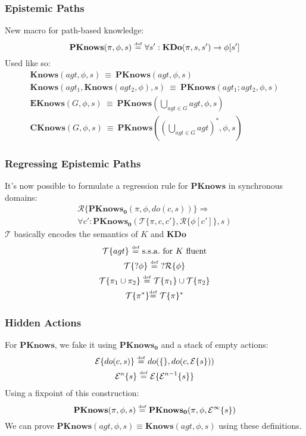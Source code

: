 \documentclass{beamer}
\newcommand{\isdef}{\hbox{$\stackrel{\mbox{\tiny def}}{=}$}}
\begin{document}
\begin{frame}
\frametitle{Epistemic Paths}
New macro for path-based knowledge:
\begin{equation*}
\mathbf{PKnows}(\pi,\phi,s)\ \isdef\ \forall s': \mathbf{KDo}(\pi,s,s') \rightarrow \phi[s']
\end{equation*}
Used like so:
\begin{gather*}
\mathbf{Knows}(agt,\phi,s)\ \equiv\ \mathbf{PKnows}(agt,\phi,s)\\
\mathbf{Knows}(agt_1,\mathbf{Knows}(agt_2,\phi),s)\ \equiv\ \mathbf{PKnows}(agt_1 ; agt_2,\phi,s)\\
\mathbf{EKnows}(G,\phi,s)\ \equiv\ \mathbf{PKnows}(\bigcup_{agt \in G}agt,\phi,s)\\
\mathbf{CKnows}(G,\phi,s)\ \equiv\ \mathbf{PKnows}((\bigcup_{agt \in G}agt)^*,\phi,s)
\end{gather*}
\end{frame}

\begin{frame}
\frametitle{Regressing Epistemic Paths}
It's now possible to formulate a regression rule for $\mathbf{PKnows}$ in synchronous domains:
\begin{multline*}
\mathcal{R}\{\mathbf{PKnows_0}(\pi,\phi,do(c,s))\} \Rightarrow \\
 \forall c': \mathbf{PKnows_0}(\mathcal{T}\{\pi,c,c'\},\mathcal{R}\{\phi[c']\},s)
\end{multline*}
$\mathcal{T}$ basically encodes the semantics of $K$ and $\mathbf{KDo}$
\begin{gather*}
\mathcal{T}\{agt\}\ \isdef\ \mathrm{s.s.a.\ for}\ K\ \mathrm{fluent} \\
\mathcal{T}\{?\phi\}\ \isdef\ ?\mathcal{R}\{\phi\} \\
\mathcal{T}\{\pi_1\cup\pi_2\}\ \isdef\ \mathcal{T}\{\pi_1\}\cup\mathcal{T}\{\pi_2\} \\
\mathcal{T}\{\pi^*\} \isdef\ \mathcal{T}\{\pi\}^*
\end{gather*}
\end{frame}

\begin{frame}
\frametitle{Hidden Actions}
For $\mathbf{PKnows}$, we fake it using $\mathbf{PKnows_0}$ and a stack of empty actions:
\begin{gather*}
\mathcal{E}\{do(c,s)\}\ \isdef\ do(\{\},do(c,\mathcal{E}\{s\})) \\
\mathcal{E}^n\{s\}\ \isdef\ \mathcal{E}\{\mathcal{E}^{n-1}\{s\}\}
\end{gather*}
Using a fixpoint of this construction:
\begin{equation*}
\mathbf{PKnows}(\pi,\phi,s)\ \isdef\ \mathbf{PKnows_0}(\pi,\phi,\mathcal{E}^{\infty}\{s\})
\end{equation*}
We can prove $\mathbf{PKnows}(agt,\phi,s) \equiv \mathbf{Knows}(agt,\phi,s)$ using these definitions.
\end{frame}
\end{document}
